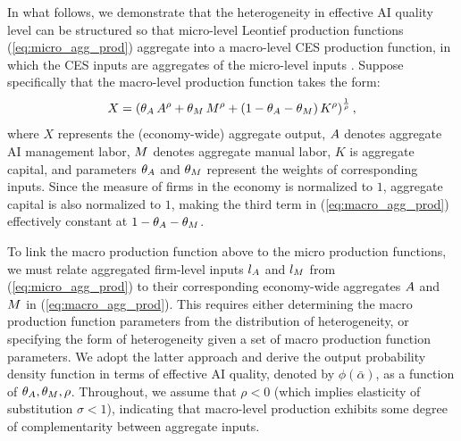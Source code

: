 In what follows, we demonstrate that the heterogeneity in effective AI quality level can be structured so that micro-level Leontief production functions (\ref{eq:micro_agg_prod}) aggregate into a macro-level CES production function, in which the CES inputs are aggregates of the micro-level inputs \citep{levhari1968note}.
Suppose specifically that the macro-level production function takes the form:
\begin{equation}
X = \left(\theta_{A}\,A^{\rho}+\theta_{M}\,M^{\rho}+(1-\theta_{A}-\theta_{M})\,K^\rho\right)^{\frac{1}{\rho}},\label{eq:macro_agg_prod}
\end{equation}
where $X$ represents the (economy-wide) aggregate output, $A$ denotes aggregate AI management labor, $M$ denotes aggregate manual labor, $K$ is aggregate capital, and parameters $\theta_{A}$ and $\theta_{M}$ represent the weights of corresponding inputs.
Since the measure of firms in the economy is normalized to $1$, aggregate capital is also normalized to $1$, making the third term in (\ref{eq:macro_agg_prod}) effectively constant at $1-\theta_{A}-\theta_{M}$.

To link the macro production function above to the micro production functions, we must relate aggregated firm-level inputs \( l_{A}\) and \( l_{M} \) from (\ref{eq:micro_agg_prod}) to their corresponding economy-wide aggregates \( A\) and \( M \) in (\ref{eq:macro_agg_prod}).
This requires either determining the macro production function parameters from the distribution of heterogeneity, or specifying the form of heterogeneity given a set of macro production function parameters.
We adopt the latter approach and derive the output probability density function in terms of effective AI quality, denoted by \( \phi(\bar{\alpha}) \), as a function of \( \theta_{A}, \theta_{M}, \rho \).
Throughout, we assume that $\rho<0$ (which implies elasticity of substitution $\sigma<1$), indicating that macro-level production exhibits some degree of complementarity between aggregate inputs.


